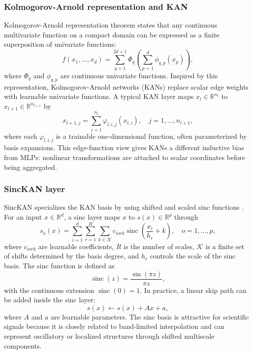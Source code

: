 \documentclass[preprint,12pt]{elsarticle}
\begin{document}
\subsubsection{Kolmogorov-Arnold representation and KAN}

Kolmogorov-Arnold representation theorem states that any continuous multivariate function on a compact domain can be expressed as a finite superposition of univariate functions:
\begin{equation}
  f(x_1,\ldots,x_d)
  =
  \sum_{q=1}^{2d+1}
  \Phi_q
  \left(
  \sum_{p=1}^{d}\phi_{q,p}(x_p)
  \right),
\end{equation}
where \(\Phi_q\) and \(\phi_{q,p}\) are continuous univariate functions. Inspired by this representation, Kolmogorov-Arnold networks (KANs) replace scalar edge weights with learnable univariate functions. A typical KAN layer maps \(x_l\in\mathbb{R}^{n_l}\) to \(x_{l+1}\in\mathbb{R}^{n_{l+1}}\) by
\begin{equation}
  x_{l+1,j}
  =
  \sum_{i=1}^{n_l}
  \varphi_{l,i,j}(x_{l,i}),
  \quad j=1,\ldots,n_{l+1},
\end{equation}
where each \(\varphi_{l,i,j}\) is a trainable one-dimensional function, often parameterized by basis expansions. This edge-function view gives KANs a different inductive bias from MLPs: nonlinear transformations are attached to scalar coordinates before being aggregated.

\subsubsection{SincKAN layer}

SincKAN specializes the KAN basis by using shifted and scaled sinc functions \cite{yu2026sinckan}. For an input \(x\in\mathbb{R}^{d}\), a sinc layer maps \(x\) to \(s(x)\in\mathbb{R}^{p}\) through
\begin{equation}
  s_o(x)
  =
  \sum_{i=1}^{d}
  \sum_{r=1}^{R}
  \sum_{k \in \mathcal{K}}
  c_{iork}
  \operatorname{sinc}\left(\frac{x_i}{h_r} + k\right),
  \quad o=1,\ldots,p,
\end{equation}
where \(c_{iork}\) are learnable coefficients, \(R\) is the number of scales, \(\mathcal{K}\) is a finite set of shifts determined by the basis degree, and \(h_r\) controls the scale of the sinc basis. The sinc function is defined as
\begin{equation}
  \operatorname{sinc}(z) = \frac{\sin(\pi z)}{\pi z},
\end{equation}
with the continuous extension \(\operatorname{sinc}(0)=1\). In practice, a linear skip path can be added inside the sinc layer:
\begin{equation}
  s(x) \leftarrow s(x) + A x + a,
\end{equation}
where \(A\) and \(a\) are learnable parameters. The sinc basis is attractive for scientific signals because it is closely related to band-limited interpolation and can represent oscillatory or localized structures through shifted multiscale components.
\end{document}
